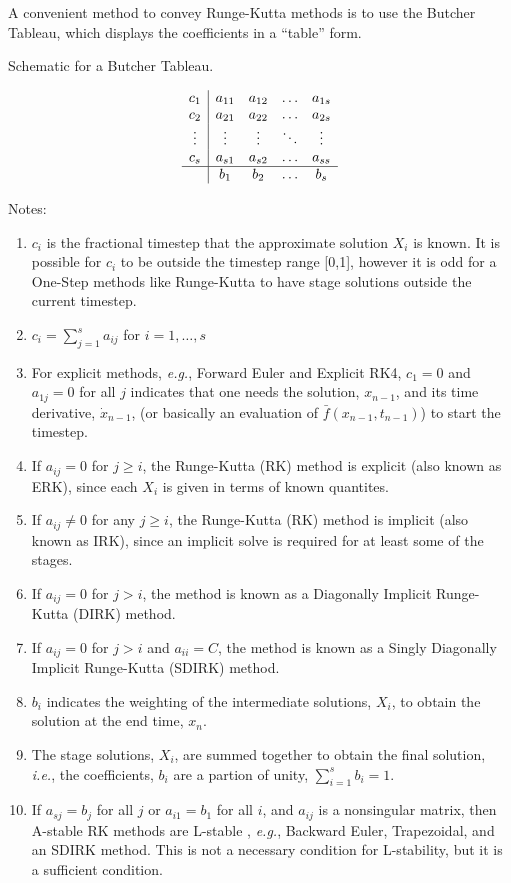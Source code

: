 A convenient method to convey Runge-Kutta methods is to use the Butcher
Tableau, which displays the coefficients in a ``table'' form.
\begin{table}[H]
\caption{Schematic for a Butcher Tableau.\label{rythmos:tab:SchematicButcherTableau}}
\[
\begin{array}{c|cccc}
c_{1} & a_{11} & a_{12} & \ldots & a_{1s}\\
c_{2} & a_{21} & a_{22} & \ldots & a_{2s}\\
\vdots & \vdots & \vdots & \ddots & \vdots\\
c_{s} & a_{s1} & a_{s2} & \ldots & a_{ss}\\
\hline  & b_{1} & b_{2} & \ldots & b_{s}
\end{array}
\]
\end{table}
Notes:
\begin{enumerate}
\item $c_{i}$ is the fractional timestep that the approximate solution
$X_{i}$ is known. It is possible for $c_{i}$ to be outside the timestep
range {[}0,1{]}, however it is odd for a One-Step methods like Runge-Kutta
to have stage solutions outside the current timestep. 
\item $c_{i}=\sum_{j=1}^{s}a_{ij}$ for $i=1,\ldots,s$
\item For explicit methods, \emph{e.g.}, Forward Euler and Explicit RK4,
$c_{1}=0$ and $a_{1j}=0$ for all $j$ indicates that one needs the
solution, $x_{n-1}$, and its time derivative, $\dot{x}_{n-1}$, (or
basically an evaluation of $\bar{f}(x_{n-1},t_{n-1})$) to start the
timestep.
\item If $a_{ij}=0$ for $j\ge i$, the Runge-Kutta (RK) method is explicit
(also known as ERK), since each $X_{i}$ is given in terms of known
quantites.
\item If $a_{ij}\ne0$ for any $j\ge i$, the Runge-Kutta (RK) method is
implicit (also known as IRK), since an implicit solve is required
for at least some of the stages.
\item If $a_{ij}=0$ for $j>i$, the method is known as a Diagonally Implicit
Runge-Kutta (DIRK) method.
\item If $a_{ij}=0$ for $j>i$ and $a_{ii}=C$, the method is known as
a Singly Diagonally Implicit Runge-Kutta (SDIRK) method.
\item $b_{i}$ indicates the weighting of the intermediate solutions, $X_{i}$,
to obtain the solution at the end time, $x_{n}$.
\item The stage solutions, $X_{i}$, are summed together to obtain the final
solution, \emph{i.e.}, the coefficients, $b_{i}$ are a partion of
unity, $\sum_{i=1}^{s}b_{i}=1$.
\item If $a_{sj}=b_{j}$ for all $j$ or $a_{i1}=b_{1}$ for all $i$, and
$a_{ij}$ is a nonsingular matrix, then A-stable RK methods are L-stable
\cite[p. 45]{HairerWanner}\cite[p. 103]{AscherPetzold}, \emph{e.g.},
Backward Euler, Trapezoidal, and an SDIRK method. This is not a necessary
condition for L-stability, but it is a sufficient condition.
\end{enumerate}

